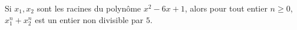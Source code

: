 Si $x_1, x_2$ sont les racines du polynôme $x^2 - 6x + 1$, alors pour tout entier $n \geq 0$, $x_1^n + x_2^n$ est un entier non divisible par $5$.
